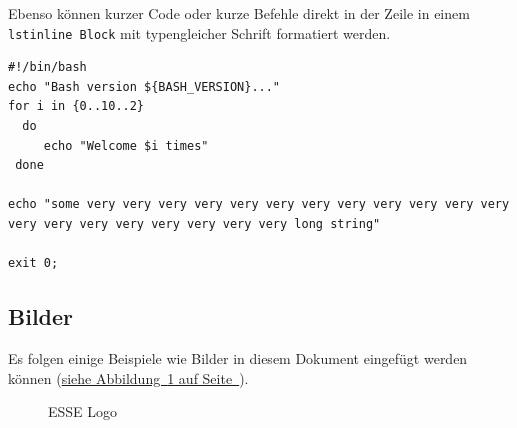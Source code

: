 \documentclass[12pt,a4paper,titlepage,oneside]{scrartcl}
\begin{document}
Ebenso können kurzer Code oder kurze Befehle direkt in der Zeile in einem \lstinline{lstinline Block} mit typengleicher Schrift formatiert werden.



\begin{lstlisting}[caption=Example bash script,label=code:beispiel2,style=simple]
#!/bin/bash
echo "Bash version ${BASH_VERSION}..."
for i in {0..10..2}
  do
     echo "Welcome $i times"
 done

echo "some very very very very very very very very very very very very very very very very very very very very long string"

exit 0;
\end{lstlisting}

\subsection{Bilder}

Es folgen einige Beispiele wie Bilder in diesem Dokument eingefügt werden können
(\hyperref[fig:logo1]{siehe Abbildung~\ref*{fig:logo1} auf Seite~\pageref*{fig:logo1}}).

\begin{figure}[h!]
  \centering
  \caption{ESSE Logo}
  \label{fig:logo1}
\end{figure}


%
%
\end{document}
